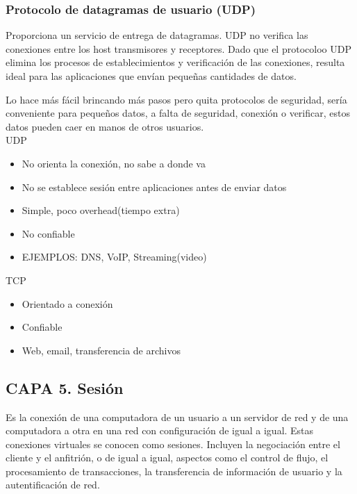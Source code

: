 \documentclass[letterpaper,12pt]{article}
\begin{document}
\begin{sloppypar}
\subsubsection{Protocolo de datagramas de usuario (UDP)}
Proporciona un servicio de entrega de datagramas. UDP no verifica las conexiones entre los host transmisores y receptores. Dado que el protocoloo UDP elimina los procesos de establecimientos y verificación de las conexiones, resulta ideal para las aplicaciones que envían pequeñas cantidades de datos.

Lo hace más fácil brincando más pasos pero quita protocolos de seguridad, sería conveniente para pequeños datos, a falta de seguridad, conexión o verificar, estos datos pueden caer en manos de otros usuarios.
\vspace{0.3cm}\\ 
UDP
\begin{itemize}
    \item No orienta la conexión, no sabe a donde va
    \item No se establece sesión entre aplicaciones antes de enviar datos
    \item Simple, poco overhead(tiempo extra)
    \item No confiable 
    \item EJEMPLOS: DNS, VoIP, Streaming(video)
\end{itemize}
TCP
\begin{itemize}
    \item Orientado a conexión 
    \item Confiable
    \item Web, email, transferencia de archivos
\end{itemize}

\subsection{CAPA 5. Sesión}
Es la conexión de una computadora de un usuario a un servidor de red y de una computadora a otra en una red con configuración de igual a igual. Estas conexiones virtuales se conocen como sesiones. Incluyen la negociación entre el cliente y el anfitrión, o de igual a igual, aspectos como el control de flujo, el procesamiento de transacciones, la transferencia de información de usuario y la autentificación de red.

\end{sloppypar}
\end{document}
